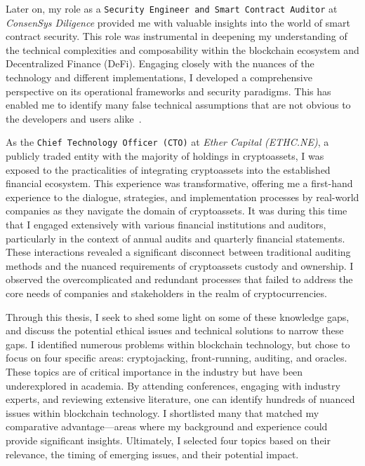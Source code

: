Later on, my role as a \texttt{Security Engineer and Smart Contract Auditor} at \textit{ConsenSys Diligence} provided me with valuable insights into the world of smart contract security. This role was instrumental in deepening my understanding of the technical complexities and composability within the blockchain ecosystem and Decentralized Finance (DeFi). Engaging closely with the nuances of the technology and different implementations, I developed a comprehensive perspective on its operational frameworks and security paradigms. This has enabled me to identify many false technical assumptions that are not obvious to the developers and users alike~\cite{shayantokenChecklist,shayanENSaudit}. 


As the \texttt{Chief Technology Officer (CTO)} at \textit{Ether Capital (ETHC.NE)}, a publicly traded entity with the majority of holdings in cryptoassets, I was exposed to the practicalities of integrating cryptoassets into the established financial ecosystem. This experience was transformative, offering me a first-hand experience to the dialogue, strategies, and implementation processes by real-world companies as they navigate the domain of cryptoassets. It was during this time that I engaged extensively with various financial institutions and auditors, particularly in the context of annual audits and quarterly financial statements. These interactions revealed a significant disconnect between traditional auditing methods and the nuanced requirements of cryptoassets custody and ownership. I observed the overcomplicated and redundant processes that failed to address the core needs of companies and stakeholders in the realm of cryptocurrencies.

Through this thesis, I seek to shed some light on some of these knowledge gaps, and discuss the potential ethical issues and technical solutions to narrow these gaps. I identified numerous problems within blockchain technology, but chose to focus on four specific areas: cryptojacking, front-running, auditing, and oracles. These topics are of critical importance in the industry but have been underexplored in academia. By attending conferences, engaging with industry experts, and reviewing extensive literature, one can identify hundreds of nuanced issues within blockchain technology. I shortlisted many that matched my comparative advantage—areas where my background and experience could provide significant insights. Ultimately, I selected four topics based on their relevance, the timing of emerging issues, and their potential impact.

